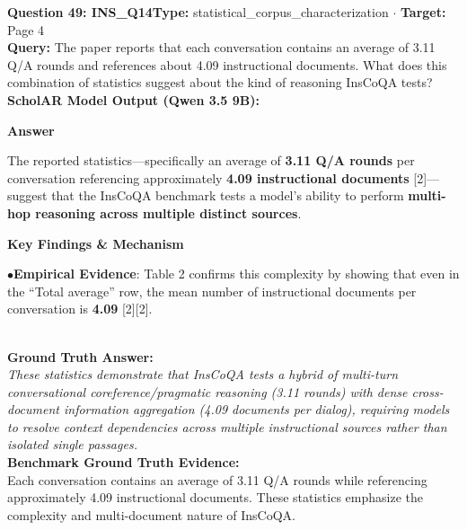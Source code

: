 \documentclass[10pt,a4paper]{article}
\begin{document}
\begin{tcolorbox}[questionbox]
{\noindent\bfseries\large\color{navy} Question 49: INS\_Q14}\hfill {\footnotesize\color{darkteal}\textbf{Type:} statistical\_corpus\_characterization $\cdot$ \textbf{Target:} Page 4}\\[4pt]
{\noindent\bfseries\color{accentblue} Query: } The paper reports that each conversation contains an average of 3.11 Q/A rounds and references about 4.09 instructional documents. What does this combination of statistics suggest about the kind of reasoning InsCoQA tests?\\[6pt]
{\noindent\bfseries\color{navy} ScholAR Model Output (Qwen 3.5 9B):}\\[2pt]
{\small \noindent \textbf{Answer}\par\vspace{3pt}The reported statistics---specifically an average of \textbf{3.11 Q/A rounds} per conversation referencing approximately \textbf{4.09 instructional documents} [2]---suggest that the InsCoQA benchmark tests a model's ability to perform \textbf{multi-hop reasoning across multiple distinct sources}.\par\vspace{3pt}\noindent \textbf{Key Findings \& Mechanism}\par\vspace{3pt}\noindent\hspace*{8pt}$\bullet$\hspace*{4pt}\textbf{Empirical Evidence}: Table 2 confirms this complexity by showing that even in the ``Total average'' row, the mean number of instructional documents per conversation is \textbf{4.09} [2][2].}\\[6pt]
{\noindent\bfseries\color{darkteal} Ground Truth Answer:}\\[2pt]
{\small\itshape These statistics demonstrate that InsCoQA tests a hybrid of multi-turn conversational coreference/pragmatic reasoning (3.11 rounds) with dense cross-document information aggregation (4.09 documents per dialog), requiring models to resolve context dependencies across multiple instructional sources rather than isolated single passages.}\\[4pt]
{\noindent\bfseries\color{darkteal} Benchmark Ground Truth Evidence:}\\[2pt]
{\footnotesize Each conversation contains an average of 3.11 Q/A rounds while referencing approximately 4.09 instructional documents. These statistics emphasize the complexity and multi-document nature of InsCoQA.}\\[4pt]

\end{tcolorbox}
\end{document}
